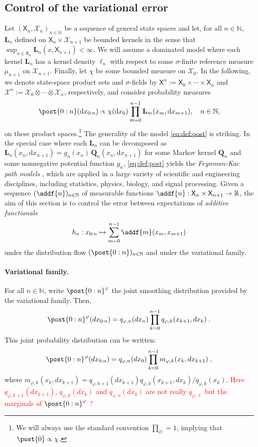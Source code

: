 \documentclass{article}
\newcommand{\Xfd}{\mathcal{X}}
\newcommand{\uksymbol}{\ell}
\newcommand{\ud}[1]{\uksymbol_{#1}}
\newcommand{\nset}{\mathbb{N}}
\newcommand{\1}{\mathbbm{1}}
\newcommand{\uk}[1]{\mathbf{L}_{#1}}
\newcommand{\tensprod}{\otimes}
\newcommand{\Xset}{\mathsf{X}}
\newcommand{\hk}{\kernel{Q}}
\newcommand{\md}[1]{g_{#1}}
\newcommand{\kernel}[1]{\mathbf{#1}}
\newcommand{\rset}{\ensuremath{\mathbb{R}}}
\newcommand{\rmd}{\ensuremath{\mathrm{d}}}
\newcommand{\eqdef}{\ensuremath{:=}}
\newcommand{\eqsp}{\;}
\begin{document}
\subsection{Control of the variational error}
Let $(\Xset_n, \Xfd_n)_{n \in \nset}$ be a sequence of general state spaces and let, for all $n \in \nset$, $\uk{n}$ defined on  $\Xset_n \times \Xfd_{n + 1}$ be bounded kernels in the sense that $\sup_{x \in \Xset_n} \uk{n}(x, \Xset_{n + 1}) < \infty$. We will assume a dominated model where each kernel $\uk{n}$ has a kernel density $\ud{n}$ with respect to some $\sigma$-finite reference measure $\mu_{n + 1}$ on $\Xfd_{n + 1}$. Finally, let $\chi$ be some bounded measure on $\Xfd_0$. In the following, we denote state-space product sets and $\sigma$-fields by $\Xset^n \eqdef \Xset_0 \times \cdots \times \Xset_n$ and $\Xfd^n \eqdef \Xfd_0 \tensprod \cdots \tensprod \Xfd_n$, respectively, and consider probability measures  
\begin{equation} \label{eq:def:post}
\post{0:n}(\rmd x_{0:n}) \propto \chi(\rmd x_0) \prod_{m = 0}^{n - 1} \uk{m}(x_m, \rmd x_{m + 1}), \quad n \in \nset, 
\end{equation}
on these product spaces.\footnote{We will always use the standard convention $\prod_{\varnothing} = 1$, implying that $\post{0} \propto \chi$.} The generality of the model \eqref{eq:def:post} is striking. In the special case where each $\uk{n}$ can be decomposed as $\uk{n}(x_n, \rmd x_{n + 1}) = \md{n}(x_n) \, \hk_n(x_n, \rmd x_{n + 1})$ for some Markov kernel $\hk_n$ and some nonnegative potential function $\md{n}$, \eqref{eq:def:post} yields the \emph{Feynman-Kac path models} \cite{delmoral:2004}, which are applied in a large variety of scientific and engineering disciplines, including statistics, physics, biology, and signal processing. 
Given a sequence $(\addf{n})_{n \in \nset}$ of measurable functions $\addf{n} : \Xset_n \times \Xset_{n + 1} \to \rset$, the aim of this section is to control  the error between expectations of \emph{additive functionals}   
\begin{equation} \label{eq:add:func}
    h_n:  x_{0:n} \mapsto \sum_{m = 0}^{n - 1} \addf{m}(x_m, x_{m + 1})
\end{equation}
under the distribution flow $(\post{0:n})_{n \in \nset}$ and under the variational family.   

\paragraph{Variational family. }
For all $n\in\nset$, write $\post{0:n}^{\varphi}$ the joint smoothing distribution provided by the variational family. Then,
$$
 \post{0:n}^{\varphi}(d x_{0:n})= q_{\varphi,n}(dx_n)\prod_{k=0}^{n-1}q_{\varphi,k}(x_{k+1},dx_k)\eqsp.
$$
This joint probability distribution can be written:
$$
 \post{0:n}^{\varphi}(d x_{0:n})= q_{\varphi,n}(dx_0)\prod_{k=0}^{n-1}m_{\varphi,k}(x_{k},dx_{k+1})\eqsp,
$$
where $m_{\varphi,k}(x_{k},dx_{k+1}) =  q_{\varphi,k+1}(dx_{k+1})q_{\varphi,k}(x_{k+1},dx_k)/q_{\varphi,k}(x_k)$. \textcolor{red}{Here $q_{\varphi,k+1}(dx_{k+1})$, $q_{\varphi,k}(dx_{k})$ and $q_{\varphi,n}(dx_0)$ are not really $ q_{\varphi,\ell}$ but the marginals  of $ \post{0:n}^{\varphi}$ ?}
\end{document}
